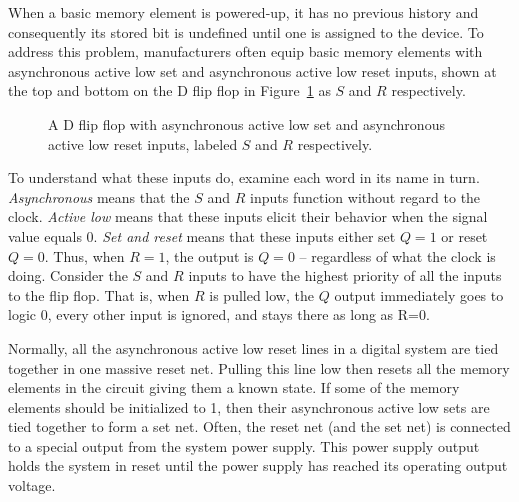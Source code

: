 When a basic memory element is powered-up, it has no previous history
and consequently its stored bit is undefined until one is assigned to
the device.  To address this problem, manufacturers often equip 
basic memory elements with 
asynchronous active low set and 
asynchronous active low reset inputs, shown at the top 
and bottom on the D flip flop in Figure~\ref{fig:sequentialCirDFFSR}
as $S$ and $R$ respectively.

\begin{figure}[ht]
\caption{A D flip flop with asynchronous active low set and asynchronous
active low reset inputs, labeled $S$ and $R$ respectively.}
\label{fig:sequentialCirDFFSR}
\end{figure}

To understand what these inputs do, examine each word in its
name in turn.  \textit{ Asynchronous} means that the $S$ and $R$ inputs 
function without regard to the clock.  \textit{ Active low} means that these 
inputs elicit their behavior when the signal value equals 0.  \textit{ Set 
and reset} means that these inputs either set $Q=1$ or reset $Q=0$.
Thus, when $R=1$, the output is $Q=0$ -- regardless of what the clock is doing.
Consider the $S$ and $R$ inputs to have the highest priority 
of all the inputs to the flip flop.  That is, when $R$ is pulled 
low, the $Q$ output immediately goes to logic 0, every other input
is ignored, and stays there as long as R=0.  

Normally, all the asynchronous active low reset lines in a digital
system are tied together in one massive reset net.  Pulling this
line low then resets all the memory elements in the circuit giving
them a known state.  If some of the memory elements should be
initialized to 1, then their asynchronous active low sets are tied
together to form a set net.  Often, the reset net (and the set net)
is connected to a special output from the system power supply.  This
power supply output holds the system in reset until the power 
supply has reached its operating output voltage.

